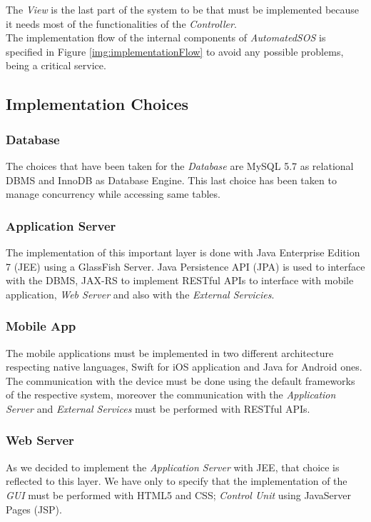 \myparagraph{}
The \textit{View} is the last part of the system to be that must be implemented because it needs most of the functionalities of the \textit{Controller}.\\
The implementation flow of the internal components of \textit{AutomatedSOS} is specified in Figure \ref{img:implementationFlow} to avoid any possible problems, being a critical service.

\subsection{Implementation Choices}

\subsubsection{Database}
The choices that have been taken for the \textit{Database} are MySQL 5.7 as relational DBMS and InnoDB as Database Engine. This last choice has been taken to manage concurrency while accessing same tables.

\subsubsection{Application Server}
The implementation of this important layer is done with Java Enterprise Edition 7 (JEE) using a GlassFish Server. Java Persistence API (JPA) is used to interface with the DBMS, JAX-RS to implement RESTful APIs to interface with mobile application, \textit{Web Server} and also with the \textit{External Servicies}.

\subsubsection{Mobile App}
The mobile applications must be implemented in two different architecture respecting native languages, Swift for iOS application and Java for Android ones. The communication with the device must be done using the default frameworks of the respective system, moreover the communication with the \textit{Application Server} and \textit{External Services} must be performed with RESTful APIs.

\subsubsection{Web Server}
As we decided to implement the \textit{Application Server} with JEE, that choice is reflected to this layer. We have only to specify that the implementation of the \textit{GUI} must be performed with HTML5 and CSS; \textit{Control Unit} using JavaServer Pages (JSP).

